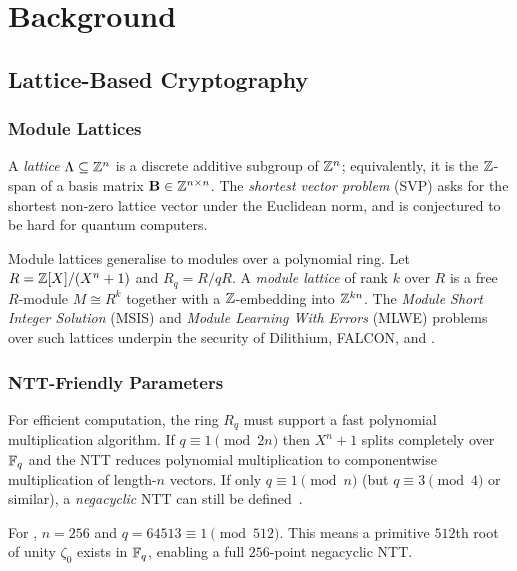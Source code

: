 
\chapter{Background}
\label{ch:background}

\section{Lattice-Based Cryptography}

\subsection{Module Lattices}

A \emph{lattice} $\Lambda \subseteq \mathbb{Z}^n$ is a discrete additive subgroup of
$\mathbb{Z}^n$; equivalently, it is the $\mathbb{Z}$-span of a basis matrix $\mathbf{B} \in
\mathbb{Z}^{n \times n}$.  The \emph{shortest vector problem} (SVP) asks for the
shortest non-zero lattice vector under the Euclidean norm, and is conjectured
to be hard for quantum computers.

Module lattices generalise to modules over a polynomial ring.  Let $R = \mathbb{Z}[X]
/ (X^n + 1)$ and $R_q = R/qR$.  A \emph{module lattice} of rank $k$ over $R$
is a free $R$-module $M \cong R^k$ together with a $\mathbb{Z}$-embedding into $\mathbb{Z}^{kn}$.
The \emph{Module Short Integer Solution} (MSIS) and \emph{Module Learning With
Errors} (MLWE) problems over such lattices underpin the security of Dilithium,
FALCON, and \haetae{}.

\subsection{NTT-Friendly Parameters}

For efficient computation, the ring $R_q$ must support a fast polynomial
multiplication algorithm.  If $q \equiv 1 \pmod{2n}$ then $X^n + 1$ splits
completely over $\mathbb{F}_q$ and the NTT reduces polynomial multiplication to
componentwise multiplication of length-$n$ vectors.  If only $q \equiv 1
\pmod{n}$ (but $q \equiv 3 \pmod{4}$ or similar), a \emph{negacyclic} NTT can
still be defined~\cite{Longa2016}.

For \haetae{}, $n = 256$ and $q = 64513 \equiv 1 \pmod{512}$.  This means a
primitive $512$th root of unity $\zeta_0$ exists in $\mathbb{F}_q$, enabling a full
$256$-point negacyclic NTT.

